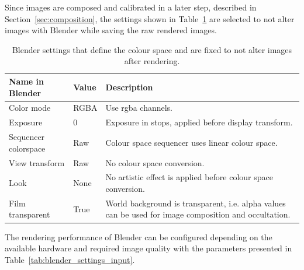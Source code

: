 Since images are composed and calibrated in a later step, described in Section~\ref{sec:composition}, the settings shown in Table~\ref{tab:color_space} are selected to not alter images with Blender while saving the raw rendered images.
\begin{table}[htb]
    \centering
    \caption{Blender settings that define the colour space and are fixed to not alter images after rendering.}
    \label{tab:color_space}
    \begin{tabular}{p{}|p{}|p{}}
        \textbf{Name in Blender}        & \textbf{Value} & \textbf{Description} \\ \hline
        Color mode           & RGBA           & Use \gls{rgba} channels. \\
        Exposure             & 0              & Exposure in stops, applied before display transform. \\
        Sequencer colorspace & Raw            & Colour space sequencer uses linear colour space. \\
        View transform       & Raw            & No colour space conversion. \\
        Look                 & None           & No artistic effect is applied before colour space conversion. \\
        Film transparent     & True           & World background is transparent, i.e. alpha values can be used for image composition and occultation.
    \end{tabular}
\end{table}

The rendering performance of Blender can be configured depending on the available hardware and required image quality with the parameters presented in Table~\ref{tab:blender_settings_input}.
\begin{table}[htb]
    \centering
    \caption{Input parameters that affect rendering performance and image quality in~\gls{sispo}.}
    \label{tab:blender_settings_input}
\end{table}

